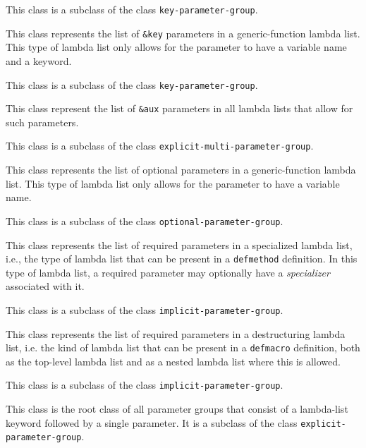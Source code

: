 This class is a subclass of the class \texttt{key-parameter-group}.


This class represents the list of \texttt{\&key} parameters in a
generic-function lambda list.  This type of lambda list only allows
for the parameter to have a variable name and a keyword.

This class is a subclass of the class \texttt{key-parameter-group}.


This class represent the list of \texttt{\&aux} parameters in all
lambda lists that allow for such parameters.

This class is a subclass of the class \texttt{explicit-multi-parameter-group}.


This class represents the list of optional parameters in a
generic-function lambda list.  This type of lambda list only allows
for the parameter to have a variable name.

This class is a subclass of the class \texttt{optional-parameter-group}.


This class represents the list of required parameters in a specialized
lambda list, i.e., the type of lambda list that can be present in a
\texttt{defmethod} definition.  In this type of lambda list, a
required parameter may optionally have a \emph{specializer} associated
with it.

This class is a subclass of the class \texttt{implicit-parameter-group}.


This class represents the list of required parameters in a destructuring
lambda list, i.e. the kind of lambda list that can be present in a
\texttt{defmacro} definition, both as the top-level lambda list and as
a nested lambda list where this is allowed.

This class is a subclass of the class \texttt{implicit-parameter-group}.


This class is the root class of all parameter groups that consist of a
lambda-list keyword followed by a single parameter.  It is a subclass
of the class \texttt{explicit-parameter-group}.

